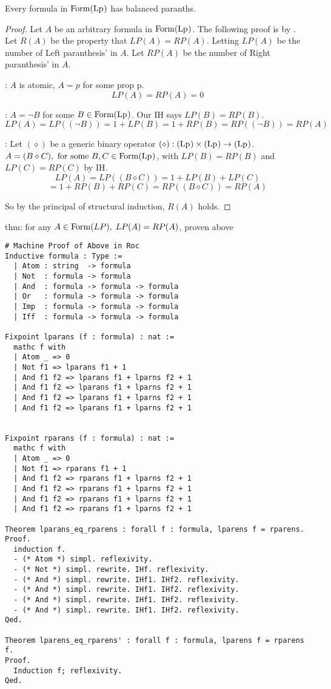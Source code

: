 \documentclass[12pt]{article}
\begin{document}
\bbox
\begin{lem}\label{lem:balance_parans_in_lp}
  Every formula in \(\mathrm{Form}(\mathrm{Lp_{}})\) has balanced paranths.
\end{lem}
\ebox
\bboxproof
\begin{proof}
  Let \(A\) be an arbitrary formula in \(\mathrm{Form}(\mathrm{Lp_{}})\). The following
  proof is by . Let \(R(A)\) be the property
  that \(LP(A)=RP(A)\). Letting \(LP(A)\) be the number of Left paranthesis'
  in \(A\). Let \(RP(A)\) be the number of Right paranthesis' in \(A\).

  : \(A\) is atomic, \(A=p\) for some prop p.
  \[LP(A)=RP(A)=0\]

  : \(A=\neg B\) for some \(B\in\mathrm{Form}(\mathrm{Lp_{}})\).
  Our IH says \(LP(B)=RP(B)\).
  \[LP(A)=LP((\neg B))=1 + LP(B)=1+RP(B)=RP((\neg B))=RP(A)\]

  : Let \((\diamond)\) be a generic binary operator
  \((\diamond):(\mathrm{Lp_{}})\times(\mathrm{Lp_{}})\to(\mathrm{Lp_{}})\). 
  \(A=(B\diamond C),\text{ for some }B,C\in\mathrm{Form}(\mathrm{Lp_{}})\), with
  \(LP(B)=RP(B)\) and \(LP(C)=RP(C)\) by IH.
  \[LP(A)=LP((B\diamond C))=1+LP(B)+LP(C)\]
  \[=1+RP(B)+RP(C)=RP((B\diamond C))=RP(A)\]

  So by the principal of structural induction, \(R(A)\) holds.
\end{proof}
\ebox


thm: for any \(A \in \mathrm{Form}(LP),\;LP(A)=RP(A)\), proven above

\begin{verbatim}
# Machine Proof of Above in Roc
Inductive formula : Type :=
  | Atom : string  -> formula
  | Not  : formula -> formula
  | And  : formula -> formula -> formula
  | Or   : formula -> formula -> formula
  | Imp  : formula -> formula -> formula
  | Iff  : formula -> formula -> formula

Fixpoint lparans (f : formula) : nat :=
  mathc f with
  | Atom _ => 0
  | Not f1 => lparans f1 + 1
  | And f1 f2 => lparans f1 + lparns f2 + 1
  | And f1 f2 => lparans f1 + lparns f2 + 1
  | And f1 f2 => lparans f1 + lparns f2 + 1
  | And f1 f2 => lparans f1 + lparns f2 + 1


Fixpoint rparans (f : formula) : nat :=
  mathc f with
  | Atom _ => 0
  | Not f1 => rparans f1 + 1
  | And f1 f2 => rparans f1 + lparns f2 + 1
  | And f1 f2 => rparans f1 + lparns f2 + 1
  | And f1 f2 => rparans f1 + lparns f2 + 1
  | And f1 f2 => rparans f1 + lparns f2 + 1

Theorem lparans_eq_rparens : forall f : formula, lparens f = rparens.
Proof.
  induction f.
  - (* Atom *) simpl. reflexivity.
  - (* Not *) simpl. rewrite. IHf. reflexivity.
  - (* And *) simpl. rewrite. IHf1. IHf2. reflexivity.
  - (* And *) simpl. rewrite. IHf1. IHf2. reflexivity.
  - (* And *) simpl. rewrite. IHf1. IHf2. reflexivity.
  - (* And *) simpl. rewrite. IHf1. IHf2. reflexivity.
Qed.

Theorem lparens_eq_rparens' : forall f : formula, lparens f = rparens f.
Proof.
  Induction f; reflexivity.
Qed.
\end{verbatim}
\end{document}
